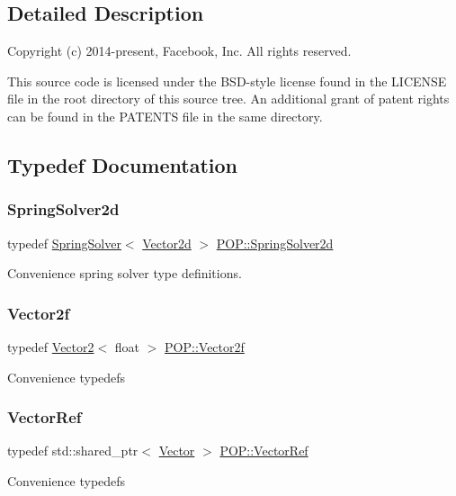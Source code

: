 \subsection{Detailed Description}
Copyright (c) 2014-\/present, Facebook, Inc. All rights reserved.

This source code is licensed under the B\+S\+D-\/style license found in the L\+I\+C\+E\+N\+SE file in the root directory of this source tree. An additional grant of patent rights can be found in the P\+A\+T\+E\+N\+TS file in the same directory. 

\subsection{Typedef Documentation}
\mbox{\label{namespace_p_o_p_abc6146ca1cb1cbf135c3c68f4ad5682b}} 
\subsubsection{\texorpdfstring{Spring\+Solver2d}{SpringSolver2d}}
{\footnotesize\ttfamily typedef \mbox{\hyperlink{class_p_o_p_1_1_spring_solver}{Spring\+Solver}}$<$ \mbox{\hyperlink{struct_p_o_p_1_1_vector2}{Vector2d}} $>$ \mbox{\hyperlink{namespace_p_o_p_abc6146ca1cb1cbf135c3c68f4ad5682b}{P\+O\+P\+::\+Spring\+Solver2d}}}

Convenience spring solver type definitions. \mbox{\label{namespace_p_o_p_a0f2c248f14bbcb8f47caca7091cca3b3}} 
\subsubsection{\texorpdfstring{Vector2f}{Vector2f}}
{\footnotesize\ttfamily typedef \mbox{\hyperlink{struct_p_o_p_1_1_vector2}{Vector2}}$<$ float $>$ \mbox{\hyperlink{namespace_p_o_p_a0f2c248f14bbcb8f47caca7091cca3b3}{P\+O\+P\+::\+Vector2f}}}

Convenience typedefs \mbox{\label{namespace_p_o_p_ae9f6819a2172ed569526091e357712f5}} 
\subsubsection{\texorpdfstring{Vector\+Ref}{VectorRef}}
{\footnotesize\ttfamily typedef std\+::shared\+\_\+ptr$<$ \mbox{\hyperlink{class_p_o_p_1_1_vector}{Vector}} $>$ \mbox{\hyperlink{namespace_p_o_p_ae9f6819a2172ed569526091e357712f5}{P\+O\+P\+::\+Vector\+Ref}}}

Convenience typedefs 